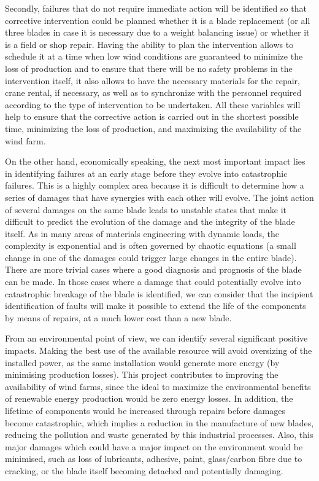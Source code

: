 Secondly, failures that do not require immediate action will be identified so that corrective intervention could be planned whether it is a blade replacement (or all three blades in case it is necessary due to a weight balancing issue) or whether it is a field or shop repair. Having the ability to plan the intervention allows to schedule it at a time when low wind conditions are guaranteed to minimize the loss of production and to ensure that there will be no safety problems in the intervention itself, it also allows to have the necessary materials for the repair, crane rental, if necessary, as well as to synchronize with the personnel required according to the type of intervention to be undertaken. All these variables will help to ensure that the corrective action is carried out in the shortest possible time, minimizing the loss of production, and maximizing the availability of the wind farm.

On the other hand, economically speaking, the next most important impact lies in identifying failures at an early stage before they evolve into catastrophic failures. This is a highly complex area because it is difficult to determine how a series of damages that have synergies with each other will evolve. The joint action of several damages on the same blade leads to unstable states that make it difficult to predict the evolution of the damage and the integrity of the blade itself. As in many areas of materials engineering with dynamic loads, the complexity is exponential and is often governed by chaotic equations (a small change in one of the damages could trigger large changes in the entire blade). There are more trivial cases where a good diagnosis and prognosis of the blade can be made. In those cases where a damage that could potentially evolve into catastrophic breakage of the blade is identified, we can consider that the incipient identification of faults will make it possible to extend the life of the components by means of repairs, at a much lower cost than a new blade.

From an environmental point of view, we can identify several significant positive impacts. Making the best use of the available resource will avoid oversizing of the installed power, as the same installation would generate more energy (by minimising production losses). This project contributes to improving the availability of wind farms, since the ideal to maximize the environmental benefits of renewable energy production would be zero energy losses. In addition, the lifetime of components would be increased through repairs before damages become catastrophic, which implies a reduction in the manufacture of new blades, reducing the pollution and waste generated by this industrial processes. Also, this major damages which could have a major impact on the environment would be minimised, such as loss of lubricants, adhesive, paint, glass/carbon fibre due to cracking, or the blade itself becoming detached and potentially damaging.

